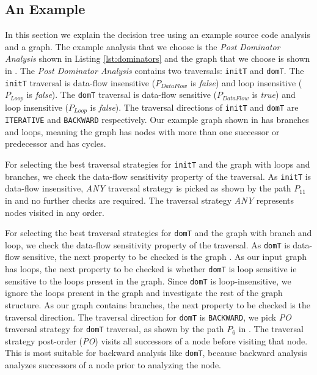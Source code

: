 \subsection{An Example}
\label{subsec:example}
In this section we explain the decision tree using an example source code analysis
and a graph.
The example analysis that we choose is the {\em Post Dominator Analysis} shown
in Listing \ref{lst:dominators} and the graph that we choose is shown in
.
The \textit{Post Dominator Analysis} contains two traversals: \lstinline|initT|
and \lstinline|domT|. 
The \lstinline|initT| traversal is data-flow insensitive ($P_{DataFlow}$ is
\textit{false}) and loop insensitive ($P_{Loop}$ is \textit{false}). The
\lstinline|domT| traversal is data-flow sensitive ($P_{DataFlow}$ is
\textit{true}) and loop insensitive ($P_{Loop}$ is \textit{false}). The
traversal directions of \lstinline|initT| and \lstinline|domT| are
\lstinline|ITERATIVE| and \lstinline|BACKWARD| respectively. 
Our example graph shown in  has branches and loops, 
meaning the graph has nodes with more than one successor or
predecessor and has cycles.
% 
% 

For selecting the best traversal strategies for \lstinline|initT| and the graph
with loops and branches, we check the data-flow sensitivity property of the
traversal.
As \lstinline|initT| is data-flow insensitive, \textit{ANY} traversal strategy
is picked as shown by the path $P_{11}$ in  and no
further checks are required. The traversal strategy \textit{ANY} represents
nodes visited in any order.

For selecting the best traversal strategies for \lstinline|domT| and the graph
with branch and loop, we check the data-flow sensitivity property of the
traversal.
As \lstinline|domT| is data-flow sensitive, the next property to be checked is
the graph \graphprop{}. As our input graph has loops, the next property to be
checked is whether \lstinline|domT| is loop sensitive ie sensitive to the loops
present in the graph. Since \lstinline|domT| is loop-insensitive, we ignore the
loops present in the graph and investigate the rest of the graph structure. As
our graph contains branches, the next property to be checked is the traversal
direction. The traversal direction for \lstinline|domT| is \lstinline|BACKWARD|,
we pick \textit{PO} traversal strategy for \lstinline|domT| traversal, as shown
by the path $P_6$ in . The traversal strategy
post-order (\textit{PO}) visits all successors of a node before visiting that
node. This is most suitable for backward analysis like \lstinline|domT|, because
backward analysis analyzes successors of a node prior to analyzing the node.

